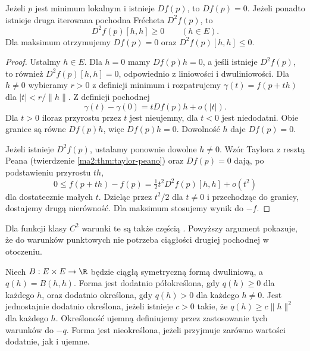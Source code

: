 \begin{twierdzenie}
\label{ma2:thm:extremum-necessary}
Jeżeli $p$ jest minimum lokalnym i istnieje $Df(p)$,
to $Df(p)=0$. Jeżeli ponadto istnieje druga iterowana
pochodna Frécheta $D^2f(p)$, to
\[
 D^2f(p)[h,h]\ge0\qquad(h\in E).
\]
Dla maksimum otrzymujemy $Df(p)=0$ oraz
$D^2f(p)[h,h]\le0$.
\end{twierdzenie}
\begin{proof}
Ustalmy $h\in E$. Dla $h=0$ mamy $Df(p)h=0$, a jeśli istnieje $D^2f(p)$,
to również $D^2f(p)[h,h]=0$, odpowiednio z liniowości
i dwuliniowości. Dla $h\ne0$ wybieramy
$r>0$ z definicji minimum i rozpatrujemy
$\gamma(t)=f(p+th)$ dla $|t|<r/\|h\|$.
Z definicji pochodnej
\[
 \gamma(t)-\gamma(0)=tDf(p)h+o(|t|).
\]
Dla $t>0$ iloraz przyrostu przez $t$ jest nieujemny,
dla $t<0$ jest niedodatni. Obie granice są równe
$Df(p)h$, więc $Df(p)h=0$. Dowolność $h$ daje
$Df(p)=0$.

Jeżeli istnieje $D^2f(p)$, ustalamy ponownie dowolne
$h\ne0$. Wzór Taylora z resztą Peana
(twierdzenie \ref{ma2:thm:taylor-peano}) oraz $Df(p)=0$
dają, po podstawieniu przyrostu $th$,
\[
 0\le f(p+th)-f(p)=\tfrac12t^2D^2f(p)[h,h]+o(t^2)
\]
dla dostatecznie małych $t$. Dzieląc przez $t^2/2$
dla $t\ne0$ i przechodząc do granicy, dostajemy
drugą nierówność. Dla maksimum stosujemy wynik do $-f$.
\end{proof}
Dla funkcji klasy $C^2$ warunki te są także częścią
.
Powyższy argument pokazuje, że do warunków punktowych
nie potrzeba ciągłości drugiej pochodnej w otoczeniu.

\begin{definicja}
\label{ma2:def:quadratic-definiteness}
Niech $B:E\times E\to\R$ będzie ciągłą symetryczną formą
dwuliniową, a $q(h)=B(h,h)$.
Forma jest dodatnio półokreślona, gdy $q(h)\ge0$
dla każdego $h$, oraz dodatnio określona, gdy
$q(h)>0$ dla każdego $h\ne0$.
Jest jednostajnie dodatnio określona, jeżeli istnieje
$c>0$ takie, że $q(h)\ge c\|h\|^2$ dla każdego $h$.
Określoność ujemną definiujemy przez zastosowanie tych
warunków do $-q$. Forma jest nieokreślona, jeżeli
przyjmuje zarówno wartości dodatnie, jak i ujemne.
\end{definicja}

